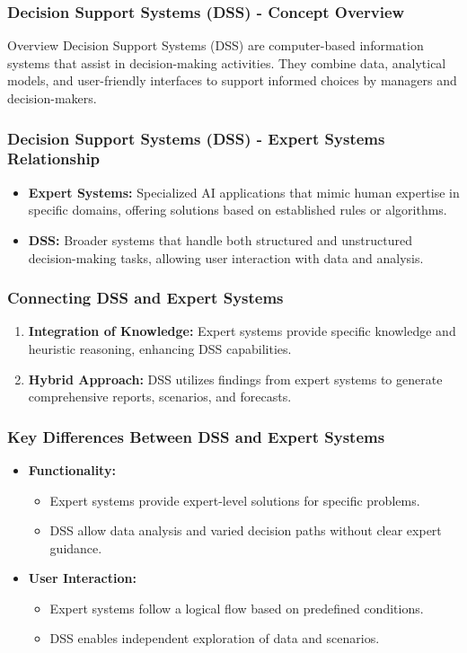 \documentclass[aspectratio=169]{beamer}
\begin{document}
\begin{frame}[fragile]
    \frametitle{Decision Support Systems (DSS) - Concept Overview}
    \begin{block}{Overview}
        Decision Support Systems (DSS) are computer-based information systems that assist in decision-making activities. They combine data, analytical models, and user-friendly interfaces to support informed choices by managers and decision-makers.
    \end{block}
\end{frame}

\begin{frame}[fragile]
    \frametitle{Decision Support Systems (DSS) - Expert Systems Relationship}
    \begin{itemize}
        \item \textbf{Expert Systems:} Specialized AI applications that mimic human expertise in specific domains, offering solutions based on established rules or algorithms.
        \item \textbf{DSS:} Broader systems that handle both structured and unstructured decision-making tasks, allowing user interaction with data and analysis.
    \end{itemize}
\end{frame}

\begin{frame}[fragile]
    \frametitle{Connecting DSS and Expert Systems}
    \begin{enumerate}
        \item \textbf{Integration of Knowledge:} 
            Expert systems provide specific knowledge and heuristic reasoning, enhancing DSS capabilities.
        \item \textbf{Hybrid Approach:} 
            DSS utilizes findings from expert systems to generate comprehensive reports, scenarios, and forecasts.
    \end{enumerate}
\end{frame}

\begin{frame}[fragile]
    \frametitle{Key Differences Between DSS and Expert Systems}
    \begin{itemize}
        \item \textbf{Functionality:} 
            \begin{itemize}
                \item Expert systems provide expert-level solutions for specific problems.
                \item DSS allow data analysis and varied decision paths without clear expert guidance.
            \end{itemize}
        \item \textbf{User Interaction:} 
            \begin{itemize}
                \item Expert systems follow a logical flow based on predefined conditions.
                \item DSS enables independent exploration of data and scenarios.
            \end{itemize}
    \end{itemize}
\end{frame}
\end{document}
